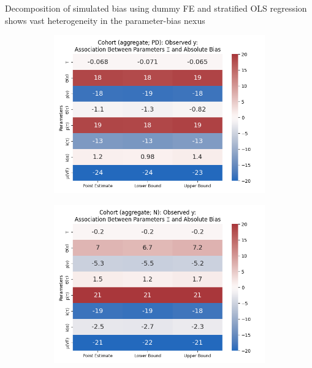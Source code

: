 \documentclass[aspectratio=169]{beamer}
\begin{document}
\begin{frame}{Decomposition of simulated bias using dummy FE and stratified OLS regression shows vast heterogeneity in the parameter-bias nexus}
\begin{figure}[H]
\begin{subfigure}[t]{0.23\linewidth}
			\centering
			\includegraphics[scale=0.25]{VEMethod_Drivers1b_FEest_Li_MSpec_Heatmap7.png}
		\end{subfigure}
		\begin{subfigure}[t]{0.23\linewidth}
			\centering
			\includegraphics[scale=0.25]{VEMethod_Drivers1b_FEest_Li_MSpec_Heatmap8.png}
		\end{subfigure}
		

\end{figure}
\end{frame}
\end{document}
